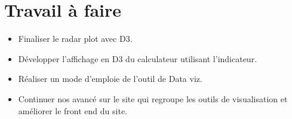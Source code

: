\documentclass{article}
\begin{document}
\section{Travail à faire}
\begin{itemize}
    \item Finaliser le radar plot avec D3.
    \item Développer l'affichage en D3 du calculateur utilisant l'indicateur.
    \item Réaliser un mode d'emploie de l'outil de Data viz.
    \item Continuer nos avancé sur le site qui regroupe les outils de visualisation et améliorer le front end du site.
\end{itemize} 
\end{document}
